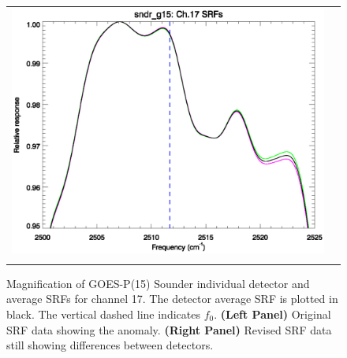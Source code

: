 \begin{figure}[htp]
\begin{tabular}{c c}
    \includegraphics[scale=0.5,trim=0 40 0 0]{graphics/zoom_anomaly/revised/sndr_g15.ch17.srf.eps} \\\\
  \end{tabular}
  \caption{Magnification of GOES-P(15) Sounder individual detector and average SRFs for channel 17. The detector average SRF is plotted in black. The vertical dashed line indicates $f_0$. \textbf{(Left Panel)} Original SRF data showing the anomaly. \textbf{(Right Panel)} Revised SRF data still showing differences between detectors.}
  \label{fig:sndr_g15.ch17.anomaly}
\end{figure}

